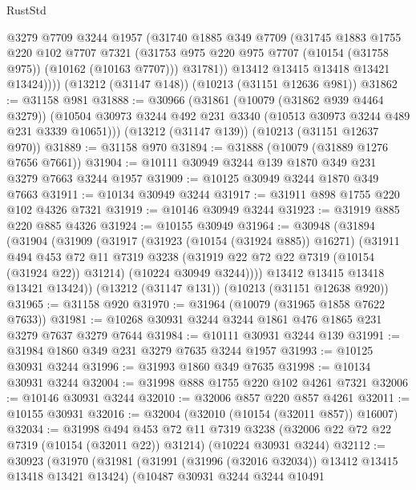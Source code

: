 \begin{lexlean}{RustStd}
\begin{coremodule}
            @3279
            @7709
            @3244
            @1957
            (@31740
              @1885
              @349
              @7709
              (@31745
                @1883
                @1755
                @220
                @102
                @7707
                @7321
                (@31753 @975 @220 @975 @7707 (@10154 (@31758 @975)) (@10162 (@10163 @7707)))
                @31781))
            @13412
            @13415
            @13418
            @13421
            @13424))))
    (@13212 (@31147 @148))
    (@10213 (@31151 @12636 @981))
@31862 := @31158 @981
@31888 := @30966
    (@31861
      (@10079 (@31862 @939 @4464 @3279))
      (@10504 @30973 @3244 @492 @231 @3340 (@10513 @30973 @3244 @489 @231 @3339 @10651)))
    (@13212 (@31147 @139))
    (@10213 (@31151 @12637 @970))
@31889 := @31158 @970
@31894 := @31888 (@10079 (@31889 @1276 @7656 @7661))
@31904 := @10111 @30949 @3244 @139 @1870 @349 @231 @3279 @7663 @3244 @1957
@31909 := @10125 @30949 @3244 @1870 @349 @7663
@31911 := @10134 @30949 @3244
@31917 := @31911 @898 @1755 @220 @102 @4326 @7321
@31919 := @10146 @30949 @3244
@31923 := @31919 @885 @220 @885 @4326
@31924 := @10155 @30949
@31964 := @30948
    (@31894
      (@31904
        (@31909
          (@31917
            (@31923 (@10154 (@31924 @885)) @16271)
            (@31911
              @494
              @453
              @72
              @11
              @7319
              @3238
              (@31919 @22 @72 @22 @7319 (@10154 (@31924 @22)) @31214)
              (@10224 @30949 @3244))))
        @13412
        @13415
        @13418
        @13421
        @13424))
    (@13212 (@31147 @131))
    (@10213 (@31151 @12638 @920))
@31965 := @31158 @920
@31970 := @31964 (@10079 (@31965 @1858 @7622 @7633))
@31981 := @10268 @30931 @3244 @3244 @1861 @476 @1865 @231 @3279 @7637 @3279 @7644
@31984 := @10111 @30931 @3244 @139
@31991 := @31984 @1860 @349 @231 @3279 @7635 @3244 @1957
@31993 := @10125 @30931 @3244
@31996 := @31993 @1860 @349 @7635
@31998 := @10134 @30931 @3244
@32004 := @31998 @888 @1755 @220 @102 @4261 @7321
@32006 := @10146 @30931 @3244
@32010 := @32006 @857 @220 @857 @4261
@32011 := @10155 @30931
@32016 := @32004 (@32010 (@10154 (@32011 @857)) @16007)
@32034 := @31998
    @494
    @453
    @72
    @11
    @7319
    @3238
    (@32006 @22 @72 @22 @7319 (@10154 (@32011 @22)) @31214)
    (@10224 @30931 @3244)
@32112 := @30923
    (@31970
      (@31981
        (@31991 (@31996 (@32016 @32034)) @13412 @13415 @13418 @13421 @13424)
        (@10487
          @30931
          @3244
          @3244
          @10491

\end{coremodule}
\end{lexlean}
